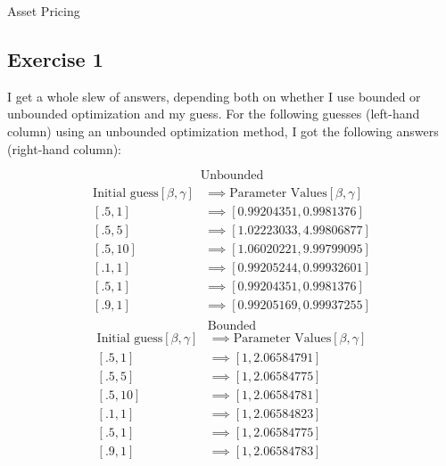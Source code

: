 \documentclass[letterpaper,12pt]{article}
\theoremstyle{definition}
\begin{document}
Asset Pricing

\subsection*{Exercise 1}
I get a whole slew of answers, depending both on whether I use bounded or unbounded optimization and my guess. For the following guesses (left-hand column) using an unbounded optimization method, I got the following answers (right-hand column):

\[\text{Unbounded}\] 
\begin{align*}\\
    \text{Initial guess} [\beta,\gamma] &\implies \text{Parameter Values}[\beta,\gamma]\\
[.5,1] &\implies [ 0.99204351,  0.9981376 ]\\
[.5,5] &\implies [1.02223033,  4.99806877]\\
[.5,10] &\implies[ 1.06020221,  9.99799095]\\
[.1,1] &\implies[ 0.99205244,  0.99932601]\\
[.5,1] &\implies[ 0.99204351,  0.9981376 ]\\
[.9,1] &\implies[ 0.99205169,  0.99937255]\\
\end{align*}
\[\text{Bounded}\] 
\begin{align*}
    \text{Initial guess} [\beta,\gamma] &\implies \text{Parameter Values}[\beta,\gamma]\\
[.5,1] &\implies[ 1        ,  2.06584791]\\
[.5,5] &\implies[ 1        ,  2.06584775]\\
[.5,10] &\implies[ 1        ,  2.06584781]\\
[.1,1] &\implies[ 1        ,  2.06584823]\\
[.5,1] &\implies[ 1       ,  2.06584775]\\
[.9,1] &\implies[ 1        ,  2.06584783]\\
\end{align*}
\end{document}
